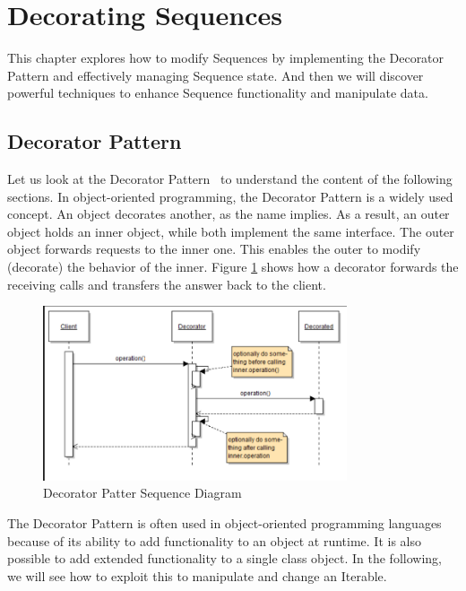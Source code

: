 \section{Decorating Sequences}
\label{sec:Decorating Sequences}
This chapter explores how to modify Sequences by implementing the Decorator 
Pattern and effectively managing Sequence state. And then we will discover 
powerful techniques to enhance Sequence functionality and manipulate data.

\subsection{Decorator Pattern}
\label{sub:Decorator Pattern}
Let us look at the Decorator Pattern~\cite[p.~226]{gang_of_four_depa} to understand the content of the 
following sections. In object-oriented programming, the Decorator Pattern is a 
widely used concept. An object decorates another, as the name implies. As a 
result, an outer object holds an inner object, while both implement the same 
interface. The outer object forwards requests to the inner one. This enables
the outer to modify (decorate) the behavior of the inner. 
Figure \ref{fig:seq_diagramm} shows how a decorator forwards the receiving calls and 
transfers the answer back to the client.

\begin{figure}[H]
    \centering
    \includegraphics[width=0.8\textwidth]{./mainmatter/pictures/decorator_sequence_diagramm.png}
    \caption{Decorator Patter Sequence Diagram}
    \label{fig:seq_diagramm}
\end{figure}

The Decorator Pattern is often used in object-oriented programming languages 
because of its ability to add functionality to an object at runtime. It is also 
possible to add extended functionality to a single class object. In the 
following, we will see how to exploit this to manipulate and change an Iterable.

